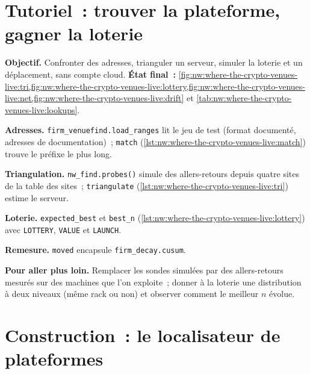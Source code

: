 \section{Tutoriel~: trouver la plateforme, gagner la loterie}\label{tut:nw:where-the-crypto-venues-live:tut}

\begin{tutorial}
\textbf{Objectif.} Confronter des adresses, trianguler un serveur, simuler la loterie et un déplacement, sans compte cloud.
\textbf{État final~:} \cref{fig:nw:where-the-crypto-venues-live:tri,fig:nw:where-the-crypto-venues-live:lottery,fig:nw:where-the-crypto-venues-live:net,fig:nw:where-the-crypto-venues-live:drift}
et \cref{tab:nw:where-the-crypto-venues-live:lookups}.
\begin{tutsteps}
\item \textbf{Adresses.} \texttt{firm\_venuefind.load\_ranges} lit le jeu de test (format documenté, adresses de documentation)~; \texttt{match}
  (\cref{lst:nw:where-the-crypto-venues-live:match}) trouve le préfixe le plus long.
\item \textbf{Triangulation.} \texttt{nw\_find.probes()} simule des allers-retours depuis quatre sites de la table des sites~; \texttt{triangulate}
  (\cref{lst:nw:where-the-crypto-venues-live:tri}) estime le serveur.
\item \textbf{Loterie.} \texttt{expected\_best} et \texttt{best\_n} (\cref{lst:nw:where-the-crypto-venues-live:lottery}) avec \texttt{LOTTERY},
  \texttt{VALUE} et \texttt{LAUNCH}.
\item \textbf{Remesure.} \texttt{moved} encapsule \texttt{firm\_decay.cusum}.
\end{tutsteps}
\textbf{Pour aller plus loin.} Remplacer les sondes simulées par des allers-retours mesurés sur des machines que l'on exploite~; donner à la loterie une distribution
à deux niveaux (même rack ou non) et observer comment le meilleur $n$ évolue.
\end{tutorial}

\section{Construction~: le localisateur de plateformes}\label{bld:nw:where-the-crypto-venues-live:venuefind}

